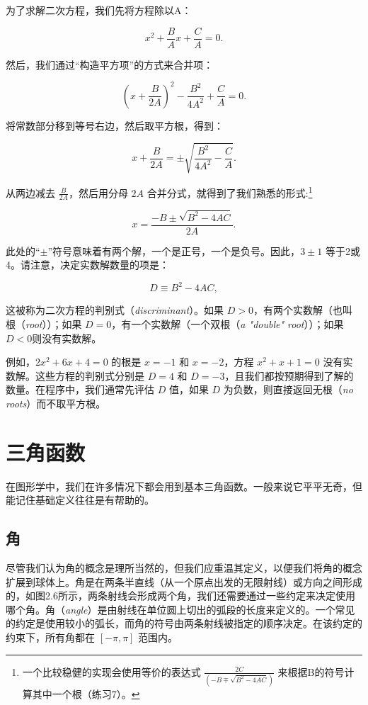 \documentclass[lang=cn,12pt]{elegantbook}
\begin{document}
为了求解二次方程，我们先将方程除以A：

$$
  x^2+\frac{B}{A} x+\frac{C}{A}=0.
$$

然后，我们通过“构造平方项”的方式来合并项：

$$
  \left(x+\frac{B}{2 A}\right)^{2}-\frac{B^{2}}{4 A^{2}}+\frac{C}{A}=0.
$$

将常数部分移到等号右边，然后取平方根，得到：

$$
  x+\frac{B}{2 A}=\pm \sqrt{\frac{B^{2}}{4 A^{2}}-\frac{C}{A}}.
$$

从两边减去 $\frac{B}{2 A}$，然后用分母 $2A$ 合并分式，就得到了我们熟悉的形式:\footnote[1]{一个比较稳健的实现会使用等价的表达式 $\frac{2C}{\left(-B \mp \sqrt{B^{2}-4 A C}\right)}$ 来根据B的符号计算其中一个根（练习7）。}


\begin{equation}
  x=\frac{-B \pm \sqrt{B^{2}-4AC}}{2A}.
\end{equation}


此处的“$\pm$”符号意味着有两个解，一个是正号，一个是负号。因此，$3\pm1$ 等于2或4。请注意，决定实数解数量的项是：

$$
  D \equiv B^{2}-4AC,
$$

这被称为二次方程的判别式（\textit{discriminant}）。如果 $D>0$，有两个实数解（也叫根（\textit{root}））；如果 $D=0$，有一个实数解（一个双根（\textit{a "double" root}））；如果 $D<0$则没有实数解。

例如，$2x^2+6x+4=0$ 的根是 $x=-1$ 和 $x=-2$，方程 $x^2+x+1=0$ 没有实数解。这些方程的判别式分别是 $D=4$ 和 $D=-3$，且我们都按预期得到了解的数量。在程序中，我们通常先评估 $D$ 值，如果 $D$ 为负数，则直接返回无根（\textit{no roots}）而不取平方根。

\section{三角函数}

在图形学中，我们在许多情况下都会用到基本三角函数。一般来说它平平无奇，但能记住基础定义往往是有帮助的。

\subsection{角}

尽管我们认为角的概念是理所当然的，但我们应重温其定义，以便我们将角的概念扩展到球体上。角是在两条半直线（从一个原点出发的无限射线）或方向之间形成的，如图2.6所示，两条射线会形成两个角，我们还需要通过一些约定来决定使用哪个角。角（\textit{angle}）是由射线在单位圆上切出的弧段的长度来定义的。一个常见的约定是使用较小的弧长，而角的符号由两条射线被指定的顺序决定。在该约定的约束下，所有角都在 $[-\pi, \pi]$ 范围内。
\end{document}
